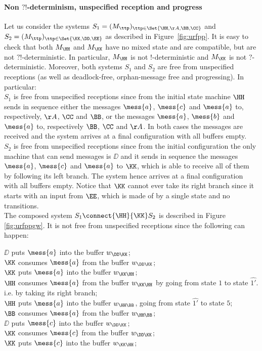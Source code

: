 {\paragraph{Non $?!$-determinism, unspecified reception and progress}

Let us consider the systems $S_1 = (M_\ttp)_{\ttp\in\Set{\HH,\AA,\BB,\CC}}$ and $S_2 = (M_\ttp)_{\ttp\in\Set{\KK,\DD,\EE}}$ as described in Figure~\ref{fig:urfpp}. It is easy to check that both $M_\HH$ and $M_\KK$
 have no mixed state and are compatible, but are not $?!$-deterministic. In particular, $M_\HH$ is not $!$-deterministic
 and $M_\KK$ is not $?$-deterministic.
  Moreover, both systems $S_1$ and $S_2$ are free from unspecified receptions (as well as deadlock-free, orphan-message free and progressing). In particular:\\
 $S_1$ is free from unspecified receptions since from the initial state machine $\HH$  sends in sequence either the messages 
 $\mess{a}$, $\mess{c}$ and $\mess{a}$ to, respectively, $\AA$, $\CC$ and $\BB$, or the messages 
 $\mess{a}$, $\mess{b}$ and $\mess{a}$ to, respectively $\BB$, $\CC$ and $\AA$. In both cases the messages are
 received and the system arrives at a final configuration with all buffers empty.\\
 $S_2$ is  free from unspecified receptions since from the initial configuration the only machine that can send messages is
 $\DD$ and it sends in  sequence the messages 
 $\mess{a}$, $\mess{c}$ and $\mess{a}$ to $\KK$, which is able to receive all of them by following its left branch.
 The system hence arrives at a final configuration  with all buffers empty. Notice that $\KK$ cannot ever take its right branch since
 it starts with an input from $\EE$, which is made of by a single state and no transitions.\\
 The composed system $S_1\connect{\HH}{\KK}S_2$ is described in  Figure \ref{fig:urfppgw}.
 It is not free from unspecified receptions since the following can happen:
  
  \vspace{2mm}
\noindent$\DD$ puts $\mess{a}$ into the buffer $w_{\DD\KK}$;\\
$\KK$ consumes $\mess{a}$ from the buffer $w_{\DD\KK}$;\\
$\KK$ puts $\mess{a}$ into the buffer $w_{\KK\HH}$;\\
$\HH$ consumes $\mess{a}$ from the buffer $w_{\KK\HH}$ by going from state $1$ to state $\widehat{1'}$. i.e. by taking its right branch;\\
$\HH$ puts $\mess{a}$ into the buffer $w_{\HH\BB}$, going from state $\widehat{1'}$ to state $5$;\\
$\BB$ consumes $\mess{a}$ from the buffer $w_{\HH\BB}$;\\
$\DD$ puts $\mess{c}$ into the buffer $w_{\DD\KK}$;\\
$\KK$ consumes $\mess{c}$ from the buffer $w_{\DD\KK}$;\\
$\KK$ puts $\mess{c}$ into the buffer $w_{\KK\HH}$;\\
\vspace{2mm}

}
